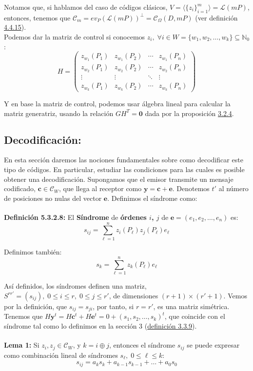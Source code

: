\documentclass[11pt,spanish]{book}
\begin{document}
Notamos que, si hablamos del caso de códigos clásicos, $V=\langle \{z_i\}_{i=1}^{m} \rangle=\mathcal{L}(mP)$, entonces, tenemos que $\mathcal{C}_m =ev_P(\mathcal{L}(mP))^{\perp} =\mathcal{C}_{\Omega}(D,mP)$ (ver definición \hyperlink{def4.4.15}{4.4.15}).
\\

Podemos dar la matriz de control si conocemos $z_i,\; \forall i\in W=\{w_1,w_2,\ldots,w_k\}\subseteq \mathbb{N}_0$:
$$H=
\begin{pmatrix}
z_{w_1}(P_1) & z_{w_1}(P_2) & \cdots & z_{w_1}(P_n)\\
z_{w_2}(P_1) & z_{w_2}(P_2) & \cdots & z_{w_2}(P_n)\\
\vdots   & \vdots   & \ddots & \vdots  \\
z_{w_k}(P_1) & z_{w_k}(P_2) & \cdots & z_{w_k}(P_n)
\end{pmatrix}
$$

Y en base la matriz de control, podemos usar álgebra lineal para calcular la matriz generatriz, usando la relación $GH^T=\mathbf{0}$ dada por la proposición \hyperlink{prop3.2.4}{3.2.4}.
\\
\subsection{Decodificación:}
En esta sección daremos las nociones fundamentales sobre como decodificar este tipo de códigos. En particular, estudiar las condiciones para las cuales es posible obtener una decodificación. Supongamos que el emisor transmite un mensaje codificado, $\mathbf{c}\in\mathcal{C}_W$, que llega al receptor como $\mathbf{y}=\mathbf{c}+\mathbf{e}$. Denotemos $t'$ al número de posiciones no nulas del vector $\mathbf{e}$.
Definimos el síndrome como:\\
\\ \textbf{Definición 5.3.2.8:} El \textbf{Síndrome} de \textbf{órdenes $i$, $j$} de $\mathbf{e}=(e_1,e_2,\ldots,e_n)$ es:
$$s_{ij}=\sum_{\ell=1}^{n}z_i(P_\ell)z_j(P_\ell)e_\ell$$

Definimos también:
$$s_k=\sum_{\ell=1}^{n}z_{k}(P_\ell)e_{\ell}$$

Así definidos, los síndromes definen una matriz, $S^{rr'}=(s_{ij}),\;0\leq i\leq r,\;0\leq j\leq r'$, de dimensiones $(r+1)\times (r'+1)$. Vemos por la definición, que $s_{ij}=s_{ji}$, por tanto, si $r=r'$, es una matriz simétrica. Tenemos que $H\mathbf{y}^{t}=H\mathbf{c}^{t}+H\mathbf{e}^{t}=0+(s_1,s_2,\ldots,s_k)^{t}$, que coincide con el síndrome tal como lo definimos en la sección 3 (\hyperlink{def3.3.9}{definición 3.3.9}).\\
\\\hypertarget{lema5.1}{ \textbf{Lema 1:}}  Si $z_i,z_j\in \mathcal{C}_W$, y $k=i\oplus j$, entonces el síndrome $s_{ij}$ se puede expresar como combinación lineal de síndromes $s_{\ell},\;0\leq \ell \leq k$:
\hypertarget{eq5.1}{\begin{equation}
    s_{ij} = a_k s_{k}+ a_{k-1}s_{k-1}+\ldots +a_{0}s_{0}
\end{equation}}
\end{document}
